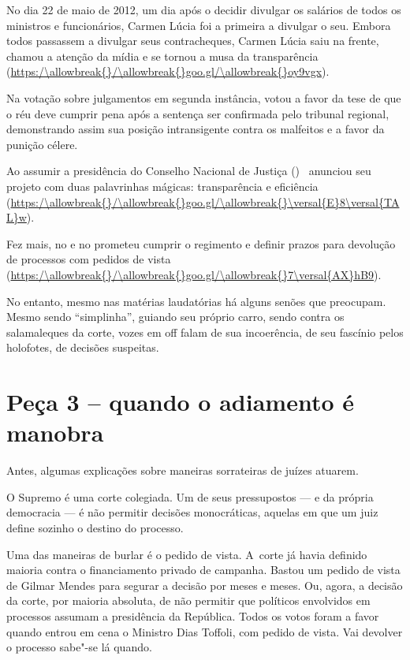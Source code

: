 No dia 22 de maio de 2012, um dia após o  decidir divulgar os
salários de todos os ministros e funcionários, Carmen Lúcia foi a
primeira a divulgar o seu. Embora todos passassem a divulgar seus
contracheques, Carmen Lúcia saiu na frente, chamou a atenção da mídia e
se tornou a musa da transparência (\url{https:/\allowbreak{}/\allowbreak{}goo.gl/\allowbreak{}oy9vgx}).

Na votação sobre julgamentos em segunda instância, votou a favor da tese
de que o réu deve cumprir pena após a sentença ser confirmada pelo
tribunal regional, demonstrando assim sua posição intransigente contra
os malfeitos e a favor da punição célere.

Ao assumir a presidência do Conselho Nacional de Justiça ()~ anunciou
seu projeto com duas palavrinhas mágicas: transparência e eficiência
(\url{https:/\allowbreak{}/\allowbreak{}goo.gl/\allowbreak{}\versal{E}8\versal{TAL}w}).

Fez mais, no  e no  prometeu cumprir o regimento e definir prazos
para devolução de processos com pedidos de vista
(\url{https:/\allowbreak{}/\allowbreak{}goo.gl/\allowbreak{}7\versal{AX}hB9}).

No entanto, mesmo nas matérias laudatórias há alguns senões que
preocupam. Mesmo sendo ``simplinha'', guiando seu próprio carro, sendo
contra os salamaleques da corte, vozes em off falam de sua incoerência,
de seu fascínio pelos holofotes, de decisões suspeitas.

\section{Peça 3 -- quando o adiamento é manobra}

Antes, algumas explicações sobre maneiras sorrateiras de juízes atuarem.

O Supremo é uma corte colegiada. Um de seus pressupostos --- e da
própria democracia --- é não permitir decisões monocráticas, aquelas em
que um juiz define sozinho o destino do processo.

Uma das maneiras de burlar é o pedido de vista. A~corte já havia
definido maioria contra o financiamento privado de campanha. Bastou um
pedido de vista de Gilmar Mendes para segurar a decisão por meses e
meses. Ou, agora, a decisão da corte, por maioria absoluta, de não
permitir que políticos envolvidos em processos assumam a presidência da
República. Todos os votos foram a favor quando entrou em cena o Ministro
Dias Toffoli, com pedido de vista. Vai devolver o processo sabe"-se lá
quando.

